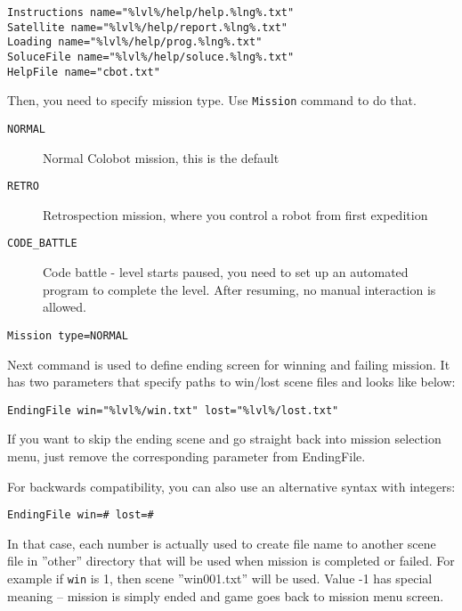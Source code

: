 \begin{lstlisting}[style=scene]
Instructions name="%lvl%/help/help.%lng%.txt"
Satellite name="%lvl%/help/report.%lng%.txt"
Loading name="%lvl%/help/prog.%lng%.txt"
SoluceFile name="%lvl%/help/soluce.%lng%.txt"
HelpFile name="cbot.txt"
\end{lstlisting}

Then, you need to specify mission type. Use \texttt{Mission} command to do that.

\begin{description}
    \item[\texttt{NORMAL}] Normal Colobot mission, this is the default
    \item[\texttt{RETRO}] Retrospection mission, where you control a robot from first expedition 
    \item[\texttt{CODE\_BATTLE}] Code battle - level starts paused, you need to set up an automated program to complete the level. After resuming, no manual interaction is allowed. 
\end{description}


\begin{lstlisting}[style=scene]
Mission type=NORMAL
\end{lstlisting}

Next command is used to define ending screen for winning and failing mission. It has two parameters that specify paths to win/lost scene files and looks like below:

\begin{lstlisting}[style=scene]
EndingFile win="%lvl%/win.txt" lost="%lvl%/lost.txt"
\end{lstlisting}

If you want to skip the ending scene and go straight back into mission selection menu, just remove the corresponding parameter from EndingFile.

For backwards compatibility, you can also use an alternative syntax with integers:

\begin{lstlisting}[style=scene]
EndingFile win=# lost=#
\end{lstlisting}

In that case, each number is actually used to create file name to another scene file in ''other'' directory that will be used when mission is completed or failed. For example if \texttt{win} is 1, then scene ''win001.txt'' will be used. Value -1 has special meaning -- mission is simply ended and game goes back to mission menu screen.

